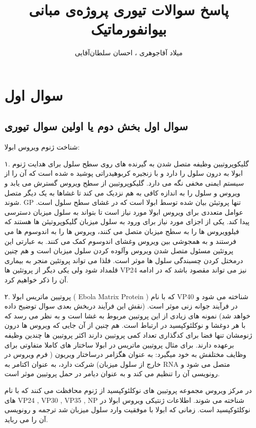 \documentclass[11pt]{article}
\title{پاسخ سوالات تیوری پروژه‌ی مبانی بیو‌انفورماتیک}
\author{میلاد آقاجوهری ، احسان سلطان‌آقایی}
\begin{document}
\maketitle
\section{سوال اول}
\subsection{سوال اول بخش دوم یا اولین سوال تیوری}
شناخت ژنوم ویروس ابولا:


۱. گلیکوپروتیین وظیفه متصل شدن به گیرنده های روی سطح سلول برای هدایت ژنوم ابولا به درون سلول را  دارد و با زنجیره کربوهیدراتی پوشید ه شده است که آن را از سیستم ایمنی مخفی نگه می دارد. گلیکوپروتیین از سطح ویروس گسترش می یابد و ویروس و سلول را به اندازه  کافی به هم نزدیک می کند تا غشاها به یک دیگر متصل شوند. GP  تنها پروتیئن بیان شده توسط ابولا است که در غشای سطح سلول است.
عوامل متعددی برای ویروس ابولا مورد نیاز است تا بتواند به سلول میزبان دسترسی پیدا کند. یکی از اجزای مورد نیاز برای ورود به سلول میزبان گلیکوپروتیئن ها هستند که فیلوویروس ها را به سطح میزبان متصل می کنند، ویروس ها را به اندوسوم ها می فرستند و به همجوشی بین ویروس وغشای اندوسوم کمک می کنند.
به عبارتی این پروتئین مسئول متصل شدن ویروس وآلوده کردن سلول میزبان است و هم چنین درمختل کردن چسبندگی سلول ها موثر است. فلذا می تواند پروتئین منجر به بیماری قلمداد شود ولی یکی دیگر از پروتئین ها VP24  نیز می تواند مقصود باشد که در ادامه آن را ذکر خواهیم کرد.

۲. پروتیین ماتریس ابولا ( Ebola Matrix Protein ) که با نام VP40 شناخته می شود و در فرآیند جوانه زنی موثر است. (نقش این فرآیند دربخش بعدی سوال توضیح داده خواهد شد)
 نمونه های زیادی از این پروتیین مربوط به غشا است و به نظر می رسد که با هر دوغشا و نوکلئوکپسید در ارتباط است. 
هم چنین از آن جایی که ویروس ها درون ژنومشان تنها  فضا برای کدگذاری تعداد کمی پروتیین دارند اکثر پروتیین ها چندین وظیفه برعهده دارند. برای مثال پروتیین ماتریس در ابولا ساختار های کاملا متفاوتی برای وظایف مختلفش به خود میگیرد: به عنوان هگزامر درساختار ویریون ( فرم ویروس در خارج از سلول میزبان) شرکت دارد،  به عنوان اکتامر به RNA متصل می شود و رونویسی آن را تنظیم می کند و به عنوان دیامر در حمل پروتیین موثر است.


در مرکز ویروس مجموعه پروتیین های نوکلئوکپسید از ژنوم محافظت می کنند که با نام های  VP24 , VP30 , VP35 , NP  شناخته می شوند. اطلاعات ژنتیکی ویروس ابولا در نوکلئوکپسید است. زمانی که ابولا با موفقیت وارد سلول میزبان شد ترجمه و رونویسی آن را می رباید.
\end{document}
